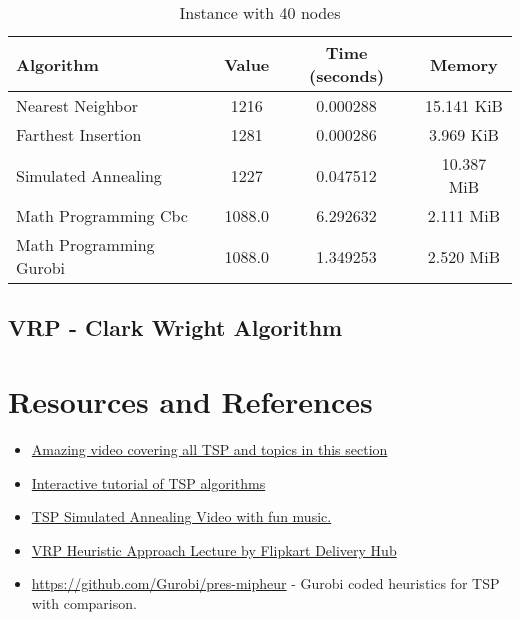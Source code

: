 \begin{table}[h]
\centering
\caption{Instance with 40 nodes}
\begin{tabularx}{\linewidth}{l c c c}
\toprule
Algorithm & Value & Time (seconds) & Memory \\
\midrule
Nearest Neighbor & 1216 & 0.000288 & 15.141 KiB \\
Farthest Insertion & 1281 & 0.000286 & 3.969 KiB \\
Simulated Annealing & 1227 & 0.047512 & 10.387 MiB \\
Math Programming Cbc & 1088.0 & 6.292632 & 2.111 MiB \\
Math Programming Gurobi & 1088.0 & 1.349253 & 2.520 MiB \\
\bottomrule
\end{tabularx}
\end{table}

\subsection{VRP - Clark Wright Algorithm}


\section*{Resources and References}
\begin{resource}

\begin{itemize}
\item \href{https://www.youtube.com/watch?v=GiDsjIBOVoA&ab_channel=Reducible}{Amazing video covering all TSP and topics in this section}
\item \href{https://cse442-17f.github.io/Traveling-Salesman-Algorithms/}{Interactive tutorial of TSP algorithms}
\item \href{https://www.youtube.com/watch?v=SC5CX8drAtU}{TSP Simulated Annealing Video with fun music.}
\item \href{https://www.youtube.com/watch?v=v9tUEsHD6BE&ab_channel=HasgeekTV}{VRP Heuristic Approach Lecture by Flipkart Delivery Hub}
\item \url{https://github.com/Gurobi/pres-mipheur} - Gurobi coded heuristics for TSP with comparison.  
\end{itemize}
\end{resource}


